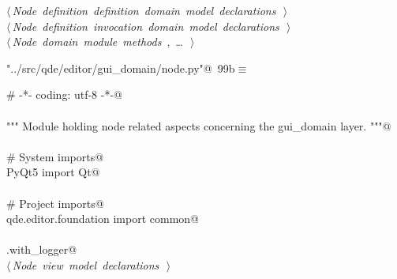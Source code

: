 \documentclass[
    a4paper,      %
    10pt,         %
    openright,    %
    notitlepage,  %
    parskip=half, %
]{scrreprt}       %
\theoremstyle{definition}                    %
\begin{document}
\begin{flushleft}
\begin{minipage}{\linewidth}
\begin{list}{}{}
\mbox{}\lstinline@@\hbox{$\langle\,${\itshape Node definition definition domain model declarations}\nobreak\ {\footnotesize {}}$\,\rangle$}\lstinline@@\\
\mbox{}\lstinline@@\hbox{$\langle\,${\itshape Node definition invocation domain model declarations}\nobreak\ {\footnotesize {}}$\,\rangle$}\lstinline@@\\
\mbox{}\lstinline@@\hbox{$\langle\,${\itshape Node domain module methods}\nobreak\ {\footnotesize {}, \ldots\ }$\,\rangle$}\lstinline@@\\
\mbox{}\lstinline@@{\NWsep}
\end{list}
\vspace{-1.5ex}
\footnotesize
\begin{list}{}{\setlength{\itemsep}{-\parsep}\setlength{\itemindent}{-\leftmargin}}

\item{}
\end{list}
\end{minipage}\vspace{4ex}
\end{flushleft}
\begin{flushleft} \small
\begin{minipage}{\linewidth}\label{scrap160}\raggedright\small
{} \verb@"../src/qde/editor/gui_domain/node.py"@\nobreak\ {\footnotesize {99b}}$\equiv$
\vspace{-1ex}
\begin{list}{}{} \item
\mbox{}\lstinline@# -*- coding: utf-8 -*-@\\
\mbox{}\lstinline@@\\
\mbox{}\lstinline@""" Module holding node related aspects concerning the gui_domain layer. """@\\
\mbox{}\lstinline@@\\
\mbox{}\lstinline@# System imports@\\
\mbox{}\lstinline@from PyQt5 import Qt@\\
\mbox{}\lstinline@@\\
\mbox{}\lstinline@# Project imports@\\
\mbox{}\lstinline@from qde.editor.foundation import common@\\
\mbox{}\lstinline@@\\
\mbox{}\lstinline@common.with_logger@\\
\mbox{}\lstinline@@\hbox{$\langle\,${\itshape Node view model declarations}\nobreak\ {\footnotesize {}}$\,\rangle$}\lstinline@@\\
\mbox{}\lstinline@@{\NWsep}
\end{list}
\vspace{-1.5ex}
\footnotesize
\begin{list}{}{\setlength{\itemsep}{-\parsep}\setlength{\itemindent}{-\leftmargin}}

\item{}
\end{list}
\end{minipage}\vspace{4ex}
\end{flushleft}
\end{document}
